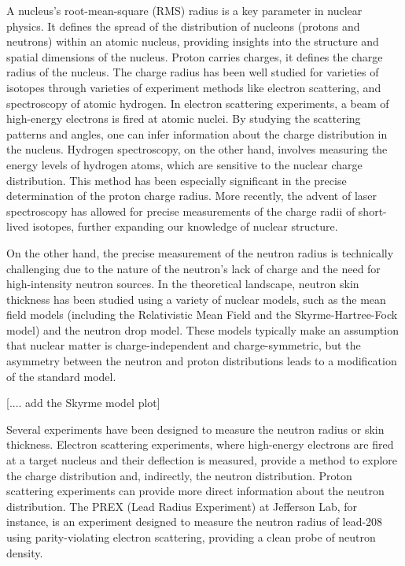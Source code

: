 A nucleus's root-mean-square (RMS) radius is a key parameter in nuclear physics. It defines the spread of the distribution of nucleons (protons and neutrons) within an atomic nucleus, providing insights into the structure and spatial dimensions of the nucleus. Proton carries charges, it defines the charge radius of the nucleus. The charge radius has been well studied for varieties of isotopes through varieties of experiment methods like electron scattering, and spectroscopy of atomic hydrogen.  In electron scattering experiments, a beam of high-energy electrons is fired at atomic nuclei. By studying the scattering patterns and angles, one can infer information about the charge distribution in the nucleus. Hydrogen spectroscopy, on the other hand, involves measuring the energy levels of hydrogen atoms, which are sensitive to the nuclear charge distribution. This method has been especially significant in the precise determination of the proton charge radius. More recently, the advent of laser spectroscopy has allowed for precise measurements of the charge radii of short-lived isotopes, further expanding our knowledge of nuclear structure.

On the other hand, the precise measurement of the neutron radius is technically challenging due to the nature of the neutron's lack of charge and the need for high-intensity neutron sources. In the theoretical landscape, neutron skin thickness has been studied using a variety of nuclear models, such as the mean field models (including the Relativistic Mean Field and the Skyrme-Hartree-Fock model) and the neutron drop model. These models typically make an assumption that nuclear matter is charge-independent and charge-symmetric, but the asymmetry between the neutron and proton distributions leads to a modification of the standard model. 

[.... add the Skyrme model plot]


Several experiments have been designed to measure the neutron radius or skin thickness. Electron scattering experiments, where high-energy electrons are fired at a target nucleus and their deflection is measured, provide a method to explore the charge distribution and, indirectly, the neutron distribution. Proton scattering experiments can provide more direct information about the neutron distribution. The PREX (Lead Radius Experiment) at Jefferson Lab, for instance, is an experiment designed to measure the neutron radius of lead-208 using parity-violating electron scattering, providing a clean probe of neutron density.


